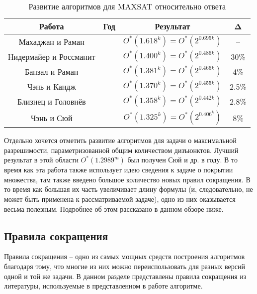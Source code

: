 \begin{table}[ht]
 \caption{Развитие алгоритмов для MAXSAT относительно ответа}
 \centering
 \begin{tabular}{|c|c|c|c|}
  \hline
  \textbf{Работа} & \textbf{Год} & \textbf{Результат} & \textbf{Δ} \\
  \hline
  Махаджан и Раман \cite{mahajan1999parameterizing} & \citeyear{mahajan1999parameterizing} & $O^*(1.618^k) = O^*(2^{0.695k})$ & -- \\
  Нидермайер и Россманит \cite{niedermeier1999new} & \citeyear{niedermeier1999new} & $O^*(1.400^k) = O^*(2^{0.486k})$ & 30\% \\
  Банзал и Раман \cite{bansal99} & \citeyear{bansal99} & $O^*(1.381^k) = O^*(2^{0.466k})$ & 4\% \\
  Чэнь и Кандж \cite{chen2004improved} & \citeyear{chen2004improved} & $O^*(1.370^k) = O^*(2^{0.455k})$ & 2.5\% \\
  Близнец и Головнёв \cite{bliznets12} & \citeyear{bliznets12} & $O^*(1.358^k) = O^*(2^{0.442k})$ & 2.8\% \\
  Чэнь и Сюй \cite{chen15} & \citeyear{chen15} & $O^*(1.325^k) = O^*(2^{0.406^k})$ & 8\% \\
  \hline
 \end{tabular}
 \label{table:maxsat-answer-research}
\end{table}

Отдельно хочется отметить развитие алгоритмов для задачи о максимальной разрешимости, параметризованной общим количеством дизъюнктов. Лучший результат в этой области $O^*(1.2989^m)$ был получен Сюй и др. \cite{xu19} в \citeyear{xu19} году. В то время как эта работа также использует идею сведения к задаче о покрытии множества, там также введено большое количество новых правил сокращения. В то время как большая их часть увеличивает длину формулы (и, следовательно, не может быть применена к рассматриваемой задаче), одно из них оказывается весьма полезным. Подробнее об этом рассказано в данном обзоре ниже.

\subsection{Правила сокращения}
\label{subsec:literature-review:rrules}

\firstpar{}Правила сокращения -- одно из самых мощных средств построения алгоритмов благодаря тому, что многие из них можно переиспользовать для разных версий одной и той же задачи. В данном разделе представлены правила сокращения из литературы, используемые в представленном в работе алгоритме.

